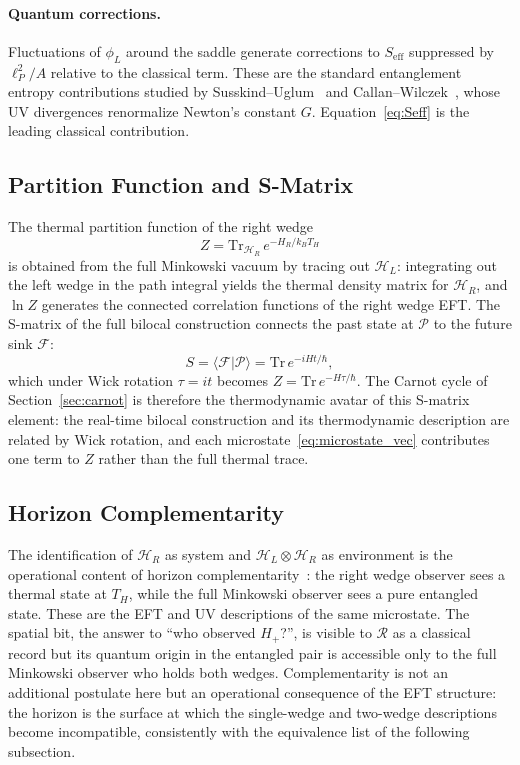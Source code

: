 \paragraph{Quantum corrections.}
Fluctuations of $\phi_L$ around the saddle 
generate corrections to $S_{\text{eff}}$ 
suppressed by $\ell_P^2/A$ relative to the 
classical term. These are the standard 
entanglement entropy contributions studied by 
Susskind--Uglum~\cite{susskind1994black} and 
Callan--Wilczek~\cite{callan1994geometric}, 
whose UV divergences renormalize Newton's 
constant $G$. Equation~\eqref{eq:Seff} is the 
leading classical contribution.

\subsection{Partition Function and S-Matrix}
\label{sec:eft_partition}

The thermal partition function of the right wedge
%
\begin{equation}
Z = \mathrm{Tr}_{\mathcal{H}_R}\,
    e^{-H_R/k_BT_H}
\end{equation}
%
is obtained from the full Minkowski vacuum by 
tracing out $\mathcal{H}_L$: integrating out the 
left wedge in the path integral yields the thermal 
density matrix for $\mathcal{H}_R$, and $\ln Z$ 
generates the connected correlation functions of 
the right wedge EFT. The S-matrix of the full 
bilocal construction connects the past state at 
$\mathcal{P}$ to the future sink $\mathcal{F}$:
%
\begin{equation}
S = \langle\mathcal{F}|\mathcal{P}\rangle
  = \mathrm{Tr}\,e^{-iHt/\hbar},
\end{equation}
%
which under Wick rotation $\tau = it$ becomes 
$Z = \mathrm{Tr}\,e^{-H\tau/\hbar}$. The Carnot 
cycle of Section~\ref{sec:carnot} is therefore 
the thermodynamic avatar of this S-matrix element: 
the real-time bilocal construction and its 
thermodynamic description are related by Wick 
rotation, and each microstate~\eqref{eq:microstate_vec} 
contributes one term to $Z$ rather than the full 
thermal trace.

\subsection{Horizon Complementarity}
\label{sec:eft_complementarity}

The identification of $\mathcal{H}_R$ as system 
and $\mathcal{H}_L \otimes \mathcal{H}_R$ as 
environment is the operational content of horizon 
complementarity~\cite{susskind1993stretched}: the 
right wedge observer sees a thermal state at $T_H$, 
while the full Minkowski observer sees a pure 
entangled state. These are the EFT and UV 
descriptions of the same microstate. The spatial 
bit, the answer to ``who observed $H_+$?'', 
is visible to $\mathcal{R}$ as a classical record 
but its quantum origin in the entangled pair is 
accessible only to the full Minkowski observer who 
holds both wedges. Complementarity is not an 
additional postulate here but an operational 
consequence of the EFT structure: the horizon is 
the surface at which the single-wedge and 
two-wedge descriptions become incompatible, 
consistently with the equivalence list of the 
following subsection.

